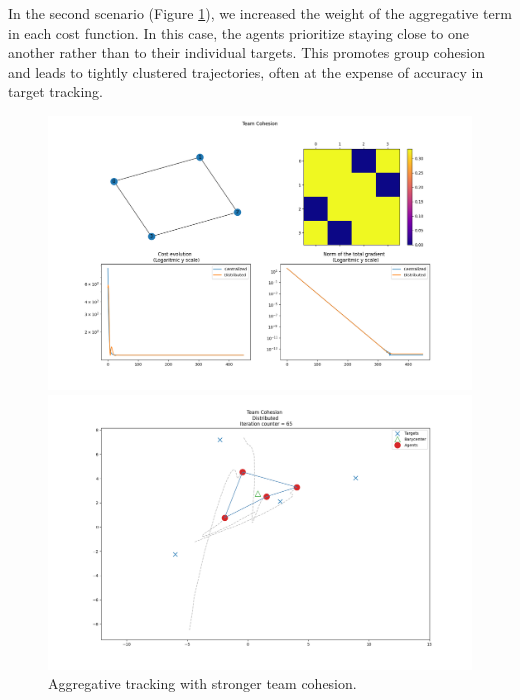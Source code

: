 In the second scenario (Figure \ref{fig:team_cohesion}), we increased the weight of the aggregative term in each cost function. In this case, the agents prioritize staying close to one another rather than to their individual targets. This promotes group cohesion and leads to tightly clustered trajectories, often at the expense of accuracy in target tracking.

\begin{figure}[h!]
  \begin{minipage}{0.50\textwidth}
    \includegraphics[width=\linewidth]{report/figs/Team_Cohesion.png}
  \end{minipage}%
  \hfill
  \begin{minipage}{0.50\textwidth}
    \includegraphics[width=\linewidth]{report/figs/Team_Cohesion_Distributed.png}
  \end{minipage}
  \caption{Aggregative tracking with stronger team cohesion.}
  \label{fig:team_cohesion}
\end{figure}

